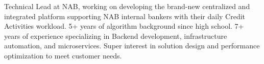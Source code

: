 

\begin{cvparagraph}

 Technical Lead at NAB, working on developing the brand-new centralized and integrated platform supporting NAB internal bankers with their daily Credit Activities workload. 5+ years of algorithm background since high school. 7+ years of experience specializing in Backend development, infrastructure automation, and microservices. Super interest in solution design and performance optimization to meet customer needs.
\end{cvparagraph}
